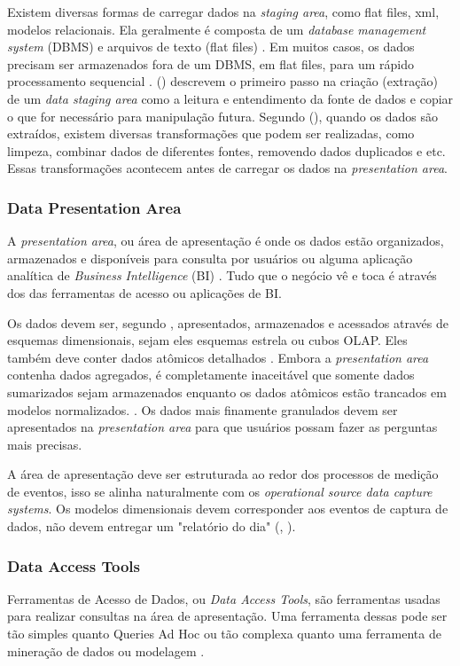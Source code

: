 Existem diversas formas de carregar dados na \textit{staging area}, como flat files, xml, modelos relacionais. Ela geralmente é composta de um \textit{database management system} (DBMS) e arquivos de texto (flat files) \citep{kimball2004}. Em muitos casos, os dados precisam ser armazenados fora de um DBMS, em flat files, para um rápido processamento sequencial \citep{kimball2004}.
\citeauthor{kimball2002} (\citeyear{kimball2002}) descrevem o primeiro passo na criação (extração) de um \textit{data staging area} como a leitura e entendimento da fonte de dados e copiar o que for necessário para manipulação futura. Segundo \citeauthor{kimball2002} (\citeyear{kimball2002}), quando os dados são extraídos, existem diversas transformações que podem ser realizadas, como limpeza, combinar dados de diferentes fontes, removendo dados duplicados e etc. Essas transformações acontecem antes de carregar os dados na \textit{presentation area}.

\subsubsection{Data Presentation Area}
A \textit{presentation area}, ou área de apresentação é onde os dados estão organizados, armazenados e disponíveis para consulta por usuários ou alguma aplicação analítica de \textit{Business Intelligence} (BI) \citep{kimball2013}. Tudo que o negócio vê e toca é através dos das ferramentas de acesso ou aplicações de BI.

Os dados devem ser, segundo \citep{kimball2013}, apresentados, armazenados e acessados através de esquemas dimensionais, sejam eles esquemas estrela ou cubos OLAP. Eles também deve conter dados atômicos detalhados \citep{kimball2013}.  Embora a \textit{presentation area} contenha dados agregados, é completamente inaceitável que somente dados sumarizados sejam armazenados enquanto os dados atômicos estão trancados em modelos normalizados. \citep{kimball2013}. Os dados mais finamente granulados devem ser apresentados na \textit{presentation area} para que usuários possam fazer as perguntas mais precisas.

A área de apresentação deve ser estruturada ao redor dos processos de medição de eventos, isso se alinha naturalmente com os \textit{operational source data capture systems}. Os modelos dimensionais devem corresponder aos eventos de captura de dados, não devem entregar um "relatório do dia" (\citeauthor{jmj}, \citeyear{jmj}). 

\subsubsection{Data Access Tools} Ferramentas de Acesso de Dados, ou \textit{Data Access Tools}, são ferramentas usadas para realizar consultas na área de apresentação. Uma ferramenta dessas pode ser tão simples quanto Queries Ad Hoc ou tão complexa quanto uma ferramenta de mineração de dados ou modelagem . 

